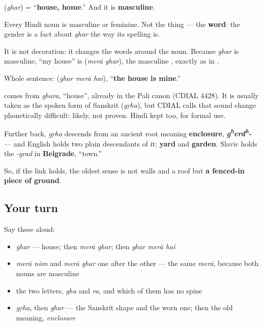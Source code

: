 \begin{grammarlens}[title={Grammar Lens: the word arrives with a gender}]
\textbf{} (\emph{ghar}) = \textquotedblleft{}\textbf{house, home}.\textquotedblright{} And it is \textbf{masculine}.

Every Hindi noun is masculine or feminine. Not the thing — the \textbf{word}: the gender is a fact about \emph{ghar} the way its spelling is.

It is not decoration: it changes the words around the noun. Because \emph{ghar} is masculine, \textquotedblleft{}my house\textquotedblright{} is \textbf{ } (\emph{merā ghar}), the masculine \textbf{}, exactly as in \textbf{ }.

Whole sentence: \textbf{  } (\emph{ghar merā hai}), \textquotedblleft{}\textbf{the house is mine}.\textquotedblright{}
\end{grammarlens}

\begin{cousinweb}
\textbf{} comes from \emph{ghara}, \textquotedblleft{}house\textquotedblright{}, already in the Pali canon (CDIAL 4428). It is usually taken as the spoken form of Sanskrit \textbf{} (\emph{gṛha}), but CDIAL calls that sound change phonetically difficult: likely, not proven. Hindi kept \textbf{} too, for formal use.

Further back, \emph{gṛha} descends from an ancient root meaning \textbf{enclosure}, \emph{\textbf{g\textsuperscript{h}erd\textsuperscript{h}-}} — and English holds two plain descendants of it: \textbf{yard} and \textbf{garden}. Slavic holds the \emph{-grad} in \textbf{Belgrade}, \textquotedblleft{}town.\textquotedblright{}

So, if the link holds, the oldest sense is not walls and a roof but \textbf{a fenced-in piece of ground}.
\end{cousinweb}

\subsection*{Your turn}
Say these aloud:

\begin{itemize}
\raggedright
  \item \emph{ghar} — house; then \emph{merā ghar}; then \emph{ghar merā hai}
  \item \emph{merā nām} and \emph{merā ghar} one after the other — the same \emph{merā}, because both nouns are masculine
  \item the two letters, \emph{gha} and \emph{ra}, and which of them has no spine
  \item \emph{gṛha}, then \emph{ghar} — the Sanskrit shape and the worn one; then the old meaning, \emph{enclosure}
\end{itemize}

